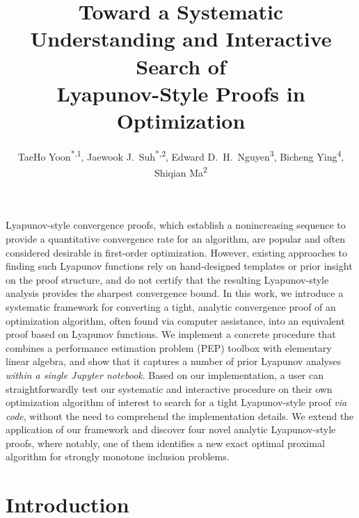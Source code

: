 \documentclass{article}
\title{Toward a Systematic Understanding and Interactive Search of \\ Lyapunov-Style Proofs in Optimization}
\author{TaeHo Yoon\textsuperscript{*,1}, Jaewook J.\ Suh\textsuperscript{*,2}, Edward D.~H.\ Nguyen\textsuperscript{3}, Bicheng Ying\textsuperscript{4}, Shiqian Ma\textsuperscript{2}}
\date{}
\theoremstyle{definition}
\theoremstyle{plain}
\renewenvironment{abstract}{%
    \small
    \paragraph{\abstractname}
  }{\par\bigskip}
\begin{document}
\renewcommand\thefootnote{\fnsymbol{footnote}}
\renewcommand\thefootnote{\arabic{footnote}}
\setcounter{footnote}{0}

\maketitle

\begin{abstract}
Lyapunov-style convergence proofs, which establish a nonincreasing sequence to provide a quantitative convergence rate for an algorithm, are popular and often considered desirable in first-order optimization.
However, existing approaches to finding such Lyapunov functions rely on hand-designed templates or prior insight on the proof structure, and do not certify that the resulting Lyapunov-style analysis provides the sharpest convergence bound.
In this work, we introduce a systematic framework for converting a tight, analytic convergence proof of an optimization algorithm, often found via computer assistance, into an equivalent proof based on Lyapunov functions.
We implement a concrete procedure that combines a performance estimation problem (PEP) toolbox with elementary linear algebra, and show that it captures a number of prior Lyapunov analyses \emph{within a single Jupyter notebook}.
Based on our implementation, a user can straightforwardly test our systematic and interactive procedure on their own optimization algorithm of interest to search for a tight Lyapunov-style proof \emph{via code}, without the need to comprehend the implementation details.
We extend the application of our framework and discover four novel analytic Lyapunov-style proofs, where notably, one of them identifies a new exact optimal proximal algorithm for strongly monotone inclusion problems.
\end{abstract}

\section{Introduction}
\label{section:introduction}
\end{document}
